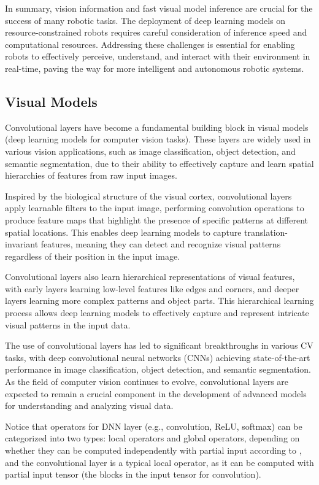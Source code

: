 In summary, vision information and fast visual model inference are crucial for the success of many robotic tasks. 
The deployment of deep learning models on resource-constrained robots requires careful consideration of inference speed and computational resources. 
Addressing these challenges is essential for enabling robots to effectively perceive, understand, and interact with their environment in real-time, paving the way for more intelligent and autonomous robotic systems.

\subsection{Visual Models}
Convolutional layers have become a fundamental building block in visual models (deep learning models for computer vision tasks). 
These layers are widely used in various vision applications, such as image classification, object detection, and semantic segmentation, due to their ability to effectively capture and learn spatial hierarchies of features from raw input images.

Inspired by the biological structure of the visual cortex, convolutional layers apply learnable filters to the input image, performing convolution operations to produce feature maps that highlight the presence of specific patterns at different spatial locations. 
This enables deep learning models to capture translation-invariant features, meaning they can detect and recognize visual patterns regardless of their position in the input image.

Convolutional layers also learn hierarchical representations of visual features, with early layers learning low-level features like edges and corners, and deeper layers learning more complex patterns and object parts. This hierarchical learning process allows deep learning models to effectively capture and represent intricate visual patterns in the input data.

The use of convolutional layers has led to significant breakthroughs in various CV tasks, with deep convolutional neural networks (CNNs) achieving state-of-the-art performance in image classification, object detection, and semantic segmentation. 
As the field of computer vision continues to evolve, convolutional layers are expected to remain a crucial component in the development of advanced models for understanding and analyzing visual data.

Notice that operators for DNN layer (e.g., convolution, ReLU, softmax) can be categorized into two types: local operators and global operators, depending on whether they can be computed independently with partial input according to \cite{sun2024hybridparallel}, and the convolutional layer is a typical local operator, as it can be computed with partial input tensor (the blocks in the input tensor for convolution).

